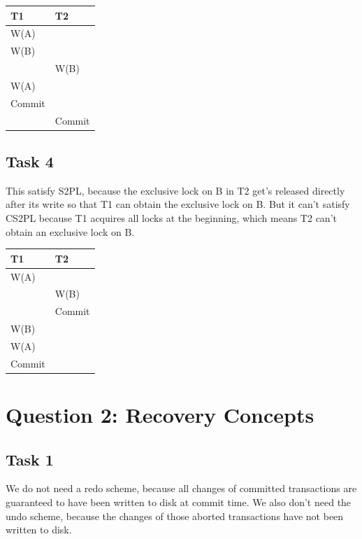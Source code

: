 \documentclass[12pt,a4paper]{article}
\begin{document}
\begin{table}[!htbp]
    \centering
    \begin{tabularx}{\textwidth}{l|l}
        \hline
        T1 & T2 \\ 
        \hline
        W(A)   &  	    \\
        W(B)   & 		\\        
               & W(B)	\\
        W(A)   & 		\\
        Commit & 		\\ 
        	   & Commit	\\      
        \hline
    \end{tabularx}
\end{table}


\subsection{Task 4}
This satisfy S2PL, because the exclusive lock on B in T2 get's released directly after its write so that T1 can obtain the exclusive lock on B.
But it can't satisfy CS2PL because T1 acquires all locks at the beginning, which means T2 can't obtain an exclusive lock on B.

\begin{table}[!htbp]
    \centering
    \begin{tabularx}{\textwidth}{l|l}
        \hline
        T1 & T2 \\ 
        \hline
        W(A)   &  	    \\
               & W(B)	\\
        	   & Commit	\\                         
        W(B)   & 		\\        
        W(A)   & 		\\
        Commit & 		\\     
        \hline
    \end{tabularx}
\end{table}


\section{Question 2: Recovery Concepts}
\subsection{Task 1}
We do not need a redo scheme, because all changes of committed transactions are guaranteed to have been written to disk at commit time.
We also don't need the undo scheme, because the changes of those aborted transactions have not been written to disk.
\end{document}
